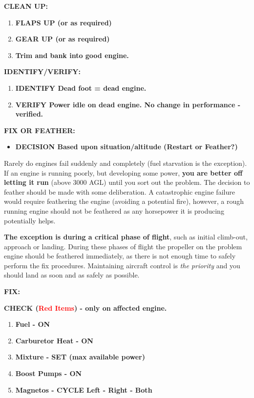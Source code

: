 \textbf{CLEAN UP:}
\begin{enumerate}
    \item \textbf{FLAPS UP (or as required)}
    \item \textbf{GEAR UP (or as required)}
    \item \textbf{Trim and bank into good engine.}
\end{enumerate}

\textbf{IDENTIFY/VERIFY:}
\begin{enumerate}
    \item \textbf{IDENTIFY Dead foot = dead engine.}
    \item \textbf{VERIFY Power idle on dead engine. No change in performance - verified.}
\end{enumerate}

\textbf{FIX OR FEATHER:}
\begin{itemize}
    \item \textbf{DECISION Based upon situation/altitude (Restart or Feather?)}
\end{itemize}

Rarely do engines fail suddenly and completely (fuel starvation is the exception). If an engine is running poorly, but
developing some power, \textbf{you are better off letting it run} (above 3000 AGL) until you sort out the problem. The
decision to feather should be made with some deliberation. A catastrophic engine failure would require feathering
the engine (avoiding a potential fire), however, a rough running engine should not be feathered as any horsepower it
is producing potentially helps.

\textbf{The exception is during a critical phase of flight}, such as initial climb-out,
approach or landing. During these phases of flight the propeller on the problem engine should be feathered
immediately, as there is not enough time to safely perform the fix procedures. Maintaining aircraft control is
\emph{the priority} and you should land as soon and as safely as possible.

\textbf{FIX:}

\textbf{CHECK (\textcolor{red}{Red Items}) - only on affected engine.}
\begin{enumerate}
    \item \textbf{Fuel - ON}
    \item \textbf{Carburetor Heat - ON}
    \item \textbf{Mixture - SET (max available power)}
    \item \textbf{Boost Pumps - ON}
    \item \textbf{Magnetos - CYCLE Left - Right - Both}
\end{enumerate}


